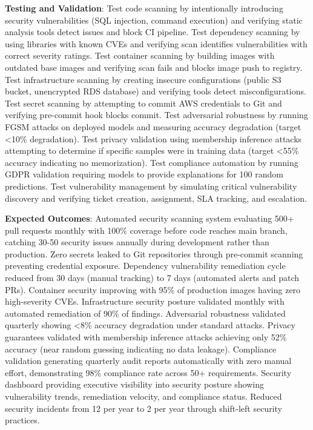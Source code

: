 \textbf{Testing and Validation}: Test code scanning by intentionally introducing security vulnerabilities (SQL injection, command execution) and verifying static analysis tools detect issues and block CI pipeline. Test dependency scanning by using libraries with known CVEs and verifying scan identifies vulnerabilities with correct severity ratings. Test container scanning by building images with outdated base images and verifying scan fails and blocks image push to registry. Test infrastructure scanning by creating insecure configurations (public S3 bucket, unencrypted RDS database) and verifying tools detect misconfigurations. Test secret scanning by attempting to commit AWS credentials to Git and verifying pre-commit hook blocks commit. Test adversarial robustness by running FGSM attacks on deployed models and measuring accuracy degradation (target <10\% degradation). Test privacy validation using membership inference attacks attempting to determine if specific samples were in training data (target <55\% accuracy indicating no memorization). Test compliance automation by running GDPR validation requiring models to provide explanations for 100 random predictions. Test vulnerability management by simulating critical vulnerability discovery and verifying ticket creation, assignment, SLA tracking, and escalation.

\textbf{Expected Outcomes}: Automated security scanning system evaluating 500+ pull requests monthly with 100\% coverage before code reaches main branch, catching 30-50 security issues annually during development rather than production. Zero secrets leaked to Git repositories through pre-commit scanning preventing credential exposure. Dependency vulnerability remediation cycle reduced from 30 days (manual tracking) to 7 days (automated alerts and patch PRs). Container security improving with 95\% of production images having zero high-severity CVEs. Infrastructure security posture validated monthly with automated remediation of 90\% of findings. Adversarial robustness validated quarterly showing <8\% accuracy degradation under standard attacks. Privacy guarantees validated with membership inference attacks achieving only 52\% accuracy (near random guessing indicating no data leakage). Compliance validation generating quarterly audit reports automatically with zero manual effort, demonstrating 98\% compliance rate across 50+ requirements. Security dashboard providing executive visibility into security posture showing vulnerability trends, remediation velocity, and compliance status. Reduced security incidents from 12 per year to 2 per year through shift-left security practices.

